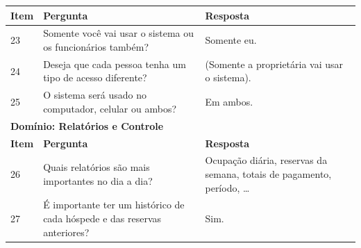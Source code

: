 \documentclass[
	12pt,				%
	openany,			%
	oneside,			%
	a4paper,			%
	english,			%
	french,				%
	spanish,			%
	brazil				%
	]{abntex2}
\begin{document}
\begin{apendicesenv}
\begin{quadro}[H]
\begin{tabular}{|p{1cm}|p{6.5cm}|p{6.5cm}|}
		\hline
		\textbf{Item} & \textbf{Pergunta} & \textbf{Resposta} \\ 
		\hline
		23 & Somente você vai usar o sistema ou os funcionários também? & Somente eu. \\
		\hline
		24 &  Deseja que cada pessoa tenha um tipo de acesso diferente? & (Somente a proprietária vai usar o sistema).\\ 
		\hline
		25 & O sistema será usado no computador, celular ou ambos? & Em ambos. \\ \hline
		\multicolumn{3}{|l|}{\textbf{Domínio: Relatórios e Controle}} \\ \hline
		\textbf{Item} & \textbf{Pergunta} & \textbf{Resposta} \\ \hline
		26 & Quais relatórios são mais importantes no dia a dia? & Ocupação diária, reservas da semana, totais de pagamento, período, …
		\\ \hline
		27 & É importante ter um histórico de cada hóspede e das reservas anteriores? & Sim. \\ 
		\hline
	\end{tabular}
\end{quadro}

\end{apendicesenv}








\printindex
\end{document}
